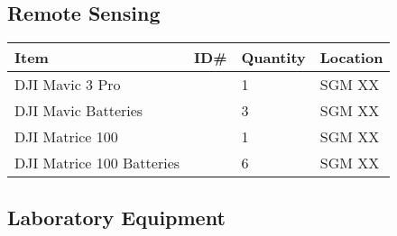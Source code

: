 \documentclass[12pt]{../SOP4_alpha}\usepackage[]{graphicx}\usepackage[]{color}
\begin{document}
\subsection{Remote Sensing}

\begin{tabular}{|l|l|l|l|}
\hline
Item      & ID\#  & Quantity & Location \\ \hline
DJI Mavic 3 Pro  && 1 & SGM XX \\
DJI Mavic Batteries && 3 & SGM XX\\
DJI Matrice 100  && 1 & SGM XX \\
DJI Matrice 100 Batteries  && 6 & SGM XX \\
\hline
\end{tabular}

\subsection{Laboratory Equipment}
\end{document}
